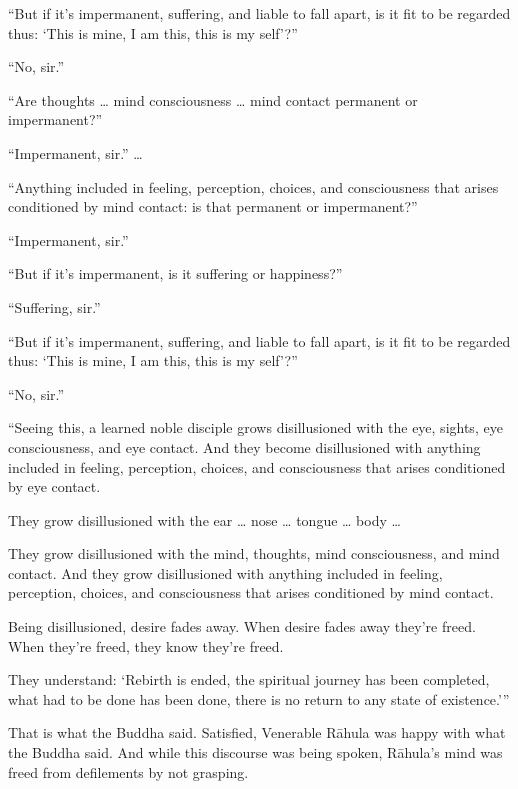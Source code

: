 \documentclass[12pt,openany]{book}%
\begin{document}
“But if it’s impermanent, suffering, and liable to fall apart, is it fit to be regarded thus: ‘This is mine, I am this, this is my self’?” 

“No, sir.” 

“Are thoughts … mind consciousness … mind contact permanent or impermanent?” 

“Impermanent, sir.” … 

“Anything included in feeling, perception, choices, and consciousness that arises conditioned by mind contact: is that permanent or impermanent?” 

“Impermanent, sir.” 

“But if it’s impermanent, is it suffering or happiness?” 

“Suffering, sir.” 

“But if it’s impermanent, suffering, and liable to fall apart, is it fit to be regarded thus: ‘This is mine, I am this, this is my self’?” 

“No, sir.” 

“Seeing this, a learned noble disciple grows disillusioned with the eye, sights, eye consciousness, and eye contact. And they become disillusioned with anything included in feeling, perception, choices, and consciousness that arises conditioned by eye contact. 

They grow disillusioned with the ear … nose … tongue … body … 

They grow disillusioned with the mind, thoughts, mind consciousness, and mind contact. And they grow disillusioned with anything included in feeling, perception, choices, and consciousness that arises conditioned by mind contact. 

Being disillusioned, desire fades away. When desire fades away they’re freed. When they’re freed, they know they’re freed. 

They understand: ‘Rebirth is ended, the spiritual journey has been completed, what had to be done has been done, there is no return to any state of existence.’” 

That is what the Buddha said. Satisfied, Venerable \textsanskrit{Rāhula} was happy with what the Buddha said. And while this discourse was being spoken, \textsanskrit{Rāhula}’s mind was freed from defilements by not grasping. 
\end{document}

